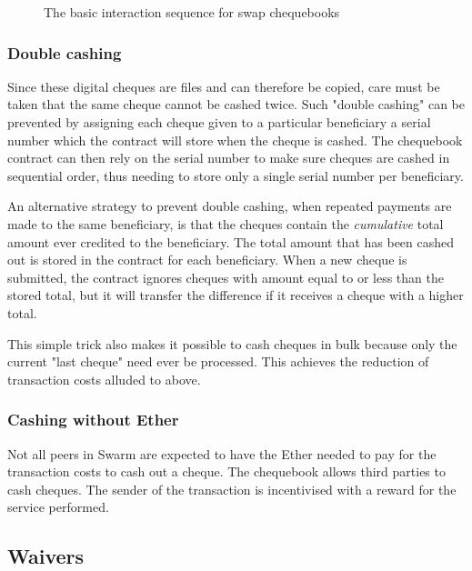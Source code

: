 \begin{figure}[htbp]
\centering

\caption[The basic interaction sequence for swap chequebooks \statusgreen]{The basic interaction sequence for swap chequebooks}
\label{fig:swap-chequebook}
\end{figure}


\subsubsection{Double cashing}

Since these digital cheques are files and can therefore be copied, care must be taken that the same cheque cannot be cashed twice. Such "double cashing" can be prevented by assigning each cheque given to a particular beneficiary a serial number which the contract will store when the cheque is cashed. The chequebook contract can then rely on the serial number to make sure cheques are cashed in sequential order, thus needing to store only a single serial number per beneficiary.

An alternative strategy to prevent double cashing, when repeated payments are made to the same beneficiary, is that the cheques contain the \emph{cumulative} total amount ever credited to the beneficiary. The total amount that has been cashed out is stored in the contract for each beneficiary. When a new cheque is submitted, the contract ignores cheques with amount equal to or less than the stored total, but it will transfer the difference if it receives a cheque with a higher total.


This simple trick also makes it possible to cash cheques in bulk because only the current "last cheque" need ever be processed. This achieves the reduction of transaction costs alluded to above.

\subsubsection{Cashing without Ether}\label{sec:zero_eth}
Not all peers in Swarm are expected to have the Ether needed to pay for the transaction costs to cash out a cheque. The chequebook allows third parties to cash cheques. The sender of the transaction is incentivised with a reward for the service performed.

\subsection{Waivers\statusgreen}\label{sec:waiver}

